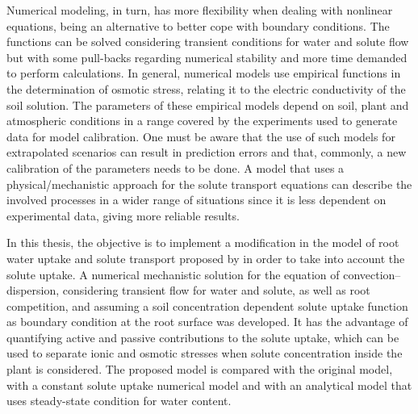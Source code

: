 Numerical modeling, in turn, has more flexibility when dealing with nonlinear equations, being an alternative to better cope with boundary conditions. 
The functions can be solved considering transient conditions for water and solute flow but with some pull-backs regarding numerical stability and more time demanded to perform calculations.
In general, numerical models use empirical functions in the determination of osmotic stress, relating it to the electric conductivity of the soil solution. 
The parameters of these empirical models depend on soil, plant and atmospheric conditions in a range covered by the experiments used to generate data for model calibration. 
One must be aware that the use of such models for extrapolated scenarios can result in prediction errors and that, commonly, a new calibration of the parameters needs to be done.
A model that uses a physical/mechanistic approach for the solute transport equations can describe the involved processes in a wider range of situations since it is less dependent on experimental data, giving more reliable results.


In this thesis, the objective is to 
implement a modification in the model of root water uptake and solute transport proposed by \citeonline[liersolute] in order to take into account the solute uptake.
A numerical mechanistic solution for the equation of convection--dispersion, considering transient flow for water and solute, as well as root competition, and assuming a soil concentration dependent solute uptake function as boundary condition at the root surface was developed.
It has the advantage of quantifying active and passive contributions to the solute uptake, which can be used to separate ionic and osmotic stresses when solute concentration inside the plant is considered. 
The proposed model is compared with 
the original model,
with a constant solute uptake numerical model and with an analytical model that uses steady-state condition for water content. 
